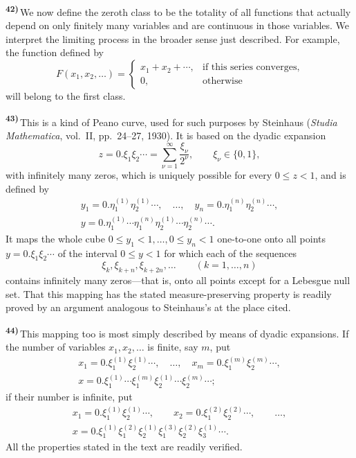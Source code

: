 \documentclass[12pt,b5paper,twoside]{article}
\newcommand{\originalnote}[1]{%
  \par\smallskip\noindent\hypertarget{note:#1}{\textsuperscript{\textbf{#1)}}}\,}
\begin{document}
\originalnote{42}We now define the zeroth class to be the totality of all functions
that actually depend on only finitely many variables and are continuous in those
variables.  We interpret the limiting process in the broader sense just described.
For example, the function defined by
\[
 F(x_1,x_2,\ldots)=
 \begin{cases}
   x_1+x_2+\cdots, & \text{if this series converges},\\
   0, & \text{otherwise}
 \end{cases}
\]
will belong to the first class.

\originalnote{43}This is a kind of Peano curve, used for such purposes by Steinhaus
(\emph{Studia Mathematica}, vol.~II, pp.~24--27, 1930).  It is based on the dyadic
expansion
\[
 z=0.\xi_1\xi_2\cdots
   =\sum_{\nu=1}^{\infty}\frac{\xi_\nu}{2^\nu},
 \qquad \xi_\nu\in\{0,1\},
\]
with infinitely many zeros, which is uniquely possible for every $0\leq z<1$, and is
defined by
\[
 \begin{gathered}
 y_1=0.\eta^{(1)}_1\eta^{(1)}_2\cdots,
 \quad\ldots,\quad
 y_n=0.\eta^{(n)}_1\eta^{(n)}_2\cdots,\\
 y=0.\eta^{(1)}_1\cdots\eta^{(n)}_1
       \eta^{(1)}_2\cdots\eta^{(n)}_2\cdots.
 \end{gathered}
\]
It maps the whole cube
$0\leq y_1<1,\ldots,0\leq y_n<1$ one-to-one onto all points
$y=0.\xi_1\xi_2\cdots$ of the interval $0\leq y<1$ for which each of the sequences
\[
 \xi_k,\xi_{k+n},\xi_{k+2n},\ldots
 \qquad(k=1,\ldots,n)
\]
contains infinitely many zeros---that is, onto all points except for a Lebesgue null
set.  That this mapping has the stated measure-preserving property is readily proved
by an argument analogous to Steinhaus's at the place cited.

\originalnote{44}This mapping too is most simply described by means of dyadic
expansions.  If the number of variables $x_1,x_2,\ldots$ is finite, say $m$, put
\[
 \begin{gathered}
 x_1=0.\xi^{(1)}_1\xi^{(1)}_2\cdots,
 \quad\ldots,\quad
 x_m=0.\xi^{(m)}_1\xi^{(m)}_2\cdots,\\
 x=0.\xi^{(1)}_1\cdots\xi^{(m)}_1
      \xi^{(1)}_2\cdots\xi^{(m)}_2\cdots;
 \end{gathered}
\]
if their number is infinite, put
\[
 \begin{gathered}
 x_1=0.\xi^{(1)}_1\xi^{(1)}_2\cdots,
 \qquad
 x_2=0.\xi^{(2)}_1\xi^{(2)}_2\cdots,
 \qquad\ldots,\\
 x=0.\xi^{(1)}_1\xi^{(2)}_1\xi^{(1)}_2
      \xi^{(3)}_1\xi^{(2)}_2\xi^{(1)}_3\cdots.
 \end{gathered}
\]
All the properties stated in the text are readily verified.
\end{document}
